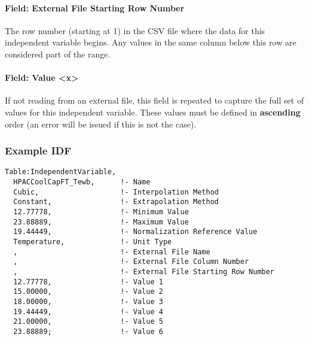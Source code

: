 \paragraph{Field: External File Starting Row
Number}\label{field-external-file-starting-row-number-1}

The row number (starting at 1) in the CSV file where the data for this
independent variable begins. Any values in the same column below this
row are considered part of the range.

\paragraph{Field: Value
\textless{}x\textgreater{}}\label{field-value-x}

If not reading from an external file, this field is repeated to capture
the full set of values for this independent variable. These values must
be defined in \textbf{ascending} order (an error will be issued if this
is not the case).

\subsubsection{Example IDF}\label{example-idf-2}

\begin{lstlisting}
Table:IndependentVariable,
  HPACCoolCapFT_Tewb,      !- Name
  Cubic,                   !- Interpolation Method
  Constant,                !- Extrapolation Method
  12.77778,                !- Minimum Value
  23.88889,                !- Maximum Value
  19.44449,                !- Normalization Reference Value
  Temperature,             !- Unit Type
  ,                        !- External File Name
  ,                        !- External File Column Number
  ,                        !- External File Starting Row Number
  12.77778,                !- Value 1
  15.00000,                !- Value 2
  18.00000,                !- Value 3
  19.44449,                !- Value 4
  21.00000,                !- Value 5
  23.88889;                !- Value 6
\end{lstlisting}
